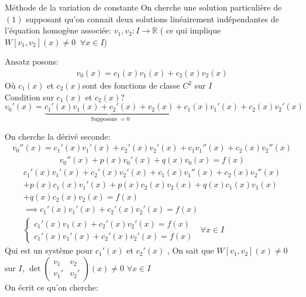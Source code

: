 \begin{parag}{Méthode de la variation de constante}
    On cherche une solution particulière de $(1)$ supposant qu'on connait deux solutions linéairement indépendantes de l'équation homogène associée: $v_1, v_2: I \to \mathbb{R}$ ( ce qui implique $W[v_1, v_2] (x) \neq 0 \; \; \forall x \in I$)

    \begin{subparag}{Ansatz}
        posons:
        \begin{align*}
            v_0(x) = c_1(x)v_1(x) + c_2(x)v_2(x) 
        \end{align*}
        Où $c_1(x)$ et $c_2(x)$sont des fonctions de classe $C^2$ sur $I$ \\
        Condition sur $c_1(x)$ et $c_2(x)$?
        \\
        $v_0'(x) = \underbrace{c_1'(x)v_1(x) + c_2'(x) + v_2(x)}_{ \text{ Supposons } =  0} + c_1(x)v_1'(x) + c_2(x)v_2'(x)$
        
        On cherche la dérivé seconde:
        \begin{align*}
            v_0''(x) = c_1'(x)v_1'(x) + c_2'(x)v_2'(x) + c_1v_1''(x) + c_2(x)v_2''(x)
        \end{align*}
       \begin{align*}
           v_0''(x) + p(x)v_0'(x) + q(x)v_0(x) = f(x) 
       \end{align*}
       \begin{align*}
           c_1'(x)v_1'(x) + c_2'(x)v_2'(x) + c_1(x)v_1''(x) + c_2(x)v_2''(x) \\
           + p(x)c_1(x)v_1'(x) + p(x)c_2(x)v_2(x) + q(x)c_1(x)v_1(x) \\
           +q(x)c_2(x)v_2(x) = f(x) \\
           \implies c_1'(x)v_1'(x) + c_2'(x)v_2'(x) = f(x) \\
           \begin{cases}
               c_1'(x) v_1(x) + c_2'(x)v_2'(x) = f(x) \\
               c_1'(x)v_1'(x) + c_2'(x)v_2'(x) = f(x)
           \end{cases} \; \; \forall x \in I
       \end{align*}
       Qui est un système pour $c_1'(x)$ et $c_2'(x)$ , On sait que $W[v_1, v_2] (x) \neq 0$ sur $I$, $\det \begin{pmatrix}
           v_1 & v_2 \\
           v_1' & v_2'
       \end{pmatrix}(x) \neq 0$ $ \forall x \in I$
       \\
       On écrit ce qu'on cherche:


\end{subparag}
\end{parag}
